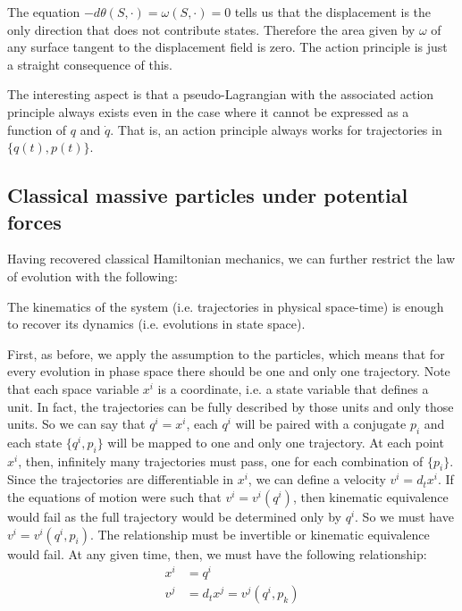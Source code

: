 \documentclass[11pt,letterpaper,fleqn]{memoir} %
\begin{document}
The equation $- d\theta(S, \cdot ) = \omega(S, \cdot ) = 0$ tells us that the displacement is the only direction that does not contribute states. Therefore the area given by $\omega$ of any surface tangent to the displacement field is zero. The action principle is just a straight consequence of this.

The interesting aspect is that a pseudo-Lagrangian with the associated action principle always exists even in the case where it cannot be expressed as a function of $q$ and $\dot q$. That is, an action principle always works for trajectories in $\{q(t), p(t)\}$.

\subsection{Classical massive particles under potential forces}

Having recovered classical Hamiltonian mechanics, we can further restrict the law of evolution with the following:

\begin{assump}
	The kinematics of the system (i.e. trajectories in physical space-time) is enough to recover its dynamics (i.e. evolutions in state space).
\end{assump}


First, as before, we apply the assumption to the particles, which means that for every evolution in phase space there should be one and only one trajectory. Note that each space variable $x^i$ is a coordinate, i.e. a state variable that defines a unit. In fact, the trajectories can be fully described by those units and only those units. So we can say that $q^i=x^i$, each $q^i$ will be paired with a conjugate $p_i$ and each state $\{q^i, p_i\}$ will be mapped to one and only one trajectory. At each point $x^i$, then, infinitely many trajectories must pass, one for each combination of $\{p_i\}$. Since the trajectories are differentiable in $x^i$, we can define a velocity $v^i = d_t x^i$. If the equations of motion were such that $v^i=v^i(q^i)$, then kinematic equivalence would fail as the full trajectory would be determined only by $q^i$. So we must have $v^i=v^i(q^i, p_i)$. The relationship must be invertible or kinematic equivalence would fail. At any given time, then, we must have the following relationship:
\begin{equation}
\begin{aligned}
x^i &= q^i \\
v^j &= d_t x^j = v^j(q^i, p_k)
\end{aligned}
\end{equation}
\end{document}
